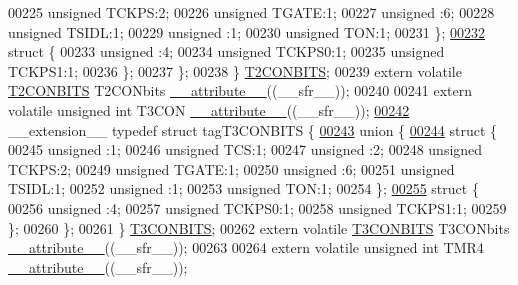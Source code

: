 \begin{DoxyCode}
00225       \textcolor{keywordtype}{unsigned} TCKPS:2;
00226       \textcolor{keywordtype}{unsigned} TGATE:1;
00227       \textcolor{keywordtype}{unsigned} :6;
00228       \textcolor{keywordtype}{unsigned} TSIDL:1;
00229       \textcolor{keywordtype}{unsigned} :1;
00230       \textcolor{keywordtype}{unsigned} TON:1;
00231     \};
\hypertarget{a00009_source_l00232}{}\hyperlink{a00009}{00232}     \textcolor{keyword}{struct }\{
00233       \textcolor{keywordtype}{unsigned} :4;
00234       \textcolor{keywordtype}{unsigned} TCKPS0:1;
00235       \textcolor{keywordtype}{unsigned} TCKPS1:1;
00236     \};
00237   \};
00238 \} \hyperlink{a00008_d4/d45/a00791}{T2CONBITS};
00239 \textcolor{keyword}{extern} \textcolor{keyword}{volatile} \hyperlink{a00008_d4/d45/a00791}{T2CONBITS} T2CONbits \hyperlink{a00009_a493c46f03454991ccc5aa7a6e1dfb2a7}{\_\_attribute\_\_}((\_\_sfr\_\_));
00240 
00241 \textcolor{keyword}{extern} \textcolor{keyword}{volatile} \textcolor{keywordtype}{unsigned} \textcolor{keywordtype}{int}  T3CON \hyperlink{a00009_a493c46f03454991ccc5aa7a6e1dfb2a7}{\_\_attribute\_\_}((\_\_sfr\_\_));
\hypertarget{a00009_source_l00242}{}\hyperlink{a00008}{00242} \_\_extension\_\_ \textcolor{keyword}{typedef} \textcolor{keyword}{struct }tagT3CONBITS \{
\hypertarget{a00009_source_l00243}{}\hyperlink{a00009}{00243}   \textcolor{keyword}{union }\{
\hypertarget{a00009_source_l00244}{}\hyperlink{a00009}{00244}     \textcolor{keyword}{struct }\{
00245       \textcolor{keywordtype}{unsigned} :1;
00246       \textcolor{keywordtype}{unsigned} TCS:1;
00247       \textcolor{keywordtype}{unsigned} :2;
00248       \textcolor{keywordtype}{unsigned} TCKPS:2;
00249       \textcolor{keywordtype}{unsigned} TGATE:1;
00250       \textcolor{keywordtype}{unsigned} :6;
00251       \textcolor{keywordtype}{unsigned} TSIDL:1;
00252       \textcolor{keywordtype}{unsigned} :1;
00253       \textcolor{keywordtype}{unsigned} TON:1;
00254     \};
\hypertarget{a00009_source_l00255}{}\hyperlink{a00009}{00255}     \textcolor{keyword}{struct }\{
00256       \textcolor{keywordtype}{unsigned} :4;
00257       \textcolor{keywordtype}{unsigned} TCKPS0:1;
00258       \textcolor{keywordtype}{unsigned} TCKPS1:1;
00259     \};
00260   \};
00261 \} \hyperlink{a00008_d5/d12/a00794}{T3CONBITS};
00262 \textcolor{keyword}{extern} \textcolor{keyword}{volatile} \hyperlink{a00008_d5/d12/a00794}{T3CONBITS} T3CONbits \hyperlink{a00009_a493c46f03454991ccc5aa7a6e1dfb2a7}{\_\_attribute\_\_}((\_\_sfr\_\_));
00263 
00264 \textcolor{keyword}{extern} \textcolor{keyword}{volatile} \textcolor{keywordtype}{unsigned} \textcolor{keywordtype}{int}  TMR4 \hyperlink{a00009_a493c46f03454991ccc5aa7a6e1dfb2a7}{\_\_attribute\_\_}((\_\_sfr\_\_));

\end{DoxyCode}
